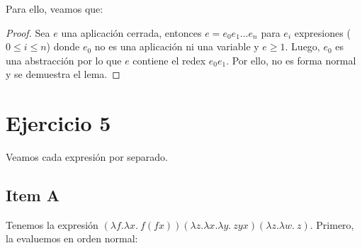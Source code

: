 \documentclass{article}
\begin{document}
Para ello, veamos que:
\begin{proof}
  Sea $e$ una aplicación cerrada, entonces $e = e_0 e_1 \dots e_n$ para $e_i$ expresiones ($0 \leq i \leq n$) donde $e_0$ no es una aplicación ni una variable y $e \geq 1$.
  Luego, $e_0$ es una abstracción por lo que $e$ contiene el redex $e_0 e_1$.
  Por ello, no es forma normal y se demuestra el lema.
\end{proof}

\section*{Ejercicio 5}
Veamos cada expresión por separado.

\subsection*{Item A}
Tenemos la expresión $(\lambda f.\lambda x.\ f(fx))(\lambda z.\lambda x.\lambda y.\ zyx)(\lambda z.\lambda w.\ z)$.
Primero, la evaluemos en orden normal:
\end{document}
